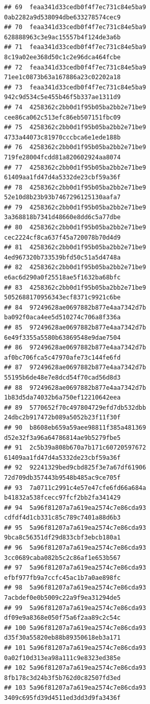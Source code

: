 \documentclass[]{article}
\begin{document}
\begin{verbatim}
## 69  feaa341d33cedb0f4f7ec731c84e5ba9   0ab2282a9d538094dbe633278574cec9
## 70  feaa341d33cedb0f4f7ec731c84e5ba9   628888963c3e9ac15557b4f124de3a6b
## 71  feaa341d33cedb0f4f7ec731c84e5ba9   8c19a02ee368d50c1c2e96dca464fcbe
## 72  feaa341d33cedb0f4f7ec731c84e5ba9   71ee1c0873b63a167886a23c02202a18
## 73  feaa341d33cedb0f4f7ec731c84e5ba9   942c9d534c5e455b46f5b337ae1311d9
## 74  4258362c2bb0d1f95b05ba2bb2e71be9   cee86ca062c513efc86eb507151fbc09
## 75  4258362c2bb0d1f95b05ba2bb2e71be9   4733a44073c81970cccbca6e1ede188b
## 76  4258362c2bb0d1f95b05ba2bb2e71be9   719fe28004fcdd81a820602924aa8074
## 77  4258362c2bb0d1f95b05ba2bb2e71be9   61409aa1fd47d4a5332de23cbf59a36f
## 78  4258362c2bb0d1f95b05ba2bb2e71be9   52e10d8b23b93b7467296125130aafa7
## 79  4258362c2bb0d1f95b05ba2bb2e71be9   3a368818b7341d48660e8dd6c5a77dbe
## 80  4258362c2bb0d1f95b05ba2bb2e71be9   cec2224cf8ca637f45a720078b70d4d9
## 81  4258362c2bb0d1f95b05ba2bb2e71be9   4ed967320b733539bfd50c51a5d4748a
## 82  4258362c2bb0d1f95b05ba2bb2e71be9   e6ac6d290a0f25518ae5f1632ba68bfc
## 83  4258362c2bb0d1f95b05ba2bb2e71be9   5052688170956343ecf8371c9921c6be
## 84  97249628ae0697882b877e4aa7342d7b   ba092f0aca4ee5d510274c706a8f336a
## 85  97249628ae0697882b877e4aa7342d7b   6e49f3355a5580b63869548e9dae7504
## 86  97249628ae0697882b877e4aa7342d7b   af0bc706fca5c47970afe73c144fe6fd
## 87  97249628ae0697882b877e4aa7342d7b   55195b6de48e7e8dcd54f70cad56d8d3
## 88  97249628ae0697882b877e4aa7342d7b   1b83d5da74032b6a750ef12210642eea
## 89  5770652f70c497804729efd7db532dbb   24dbc2b917472b089a5052b23f11f30f
## 90  b8608eb659a59aee98811f385a481369   d52e32f3a96a64786814ae9b5279fbe5
## 91  2c5b39a808b670a7b171c60720597672   61409aa1fd47d4a5332de23cbf59a36f
## 92  92241329bed9cbd825f3e7a67df61906   72d709db357443b9548b485ac9ce705f
## 93  7a0711c2991c4e57e47cfe6fd66a684a   b41832a538fcecc97fcf2bb2fa341429
## 94  5a96f81207a7a619ea2574c7e86cda93   cdfdf4d1cb331c85c789c7401a88d6b3
## 95  5a96f81207a7a619ea2574c7e86cda93   9bca8c56351df29d833cbf3ebcb180a1
## 96  5a96f81207a7a619ea2574c7e86cda93   3cc0689caba082b5c2c86af1e653b567
## 97  5a96f81207a7a619ea2574c7e86cda93   efbf977fb9a7ccfc45ac1b7a0ae898fc
## 98  5a96f81207a7a619ea2574c7e86cda93   7acbdef0e0b5009c22a9f9ea31294de5
## 99  5a96f81207a7a619ea2574c7e86cda93   df09e9a8368e050f75a6f2aa89c2c54c
## 100 5a96f81207a7a619ea2574c7e86cda93   d35f30a55820eb88b89350618eb3a171
## 101 5a96f81207a7a619ea2574c7e86cda93   0a02f10d313ea98a111c9e8323ed385e
## 102 5a96f81207a7a619ea2574c7e86cda93   8fb178c3d24b3f5b762d0c82507fd3ed
## 103 5a96f81207a7a619ea2574c7e86cda93   3409c695fd39d4511ed3dd3d9fa3436f

\end{verbatim}
\end{document}
